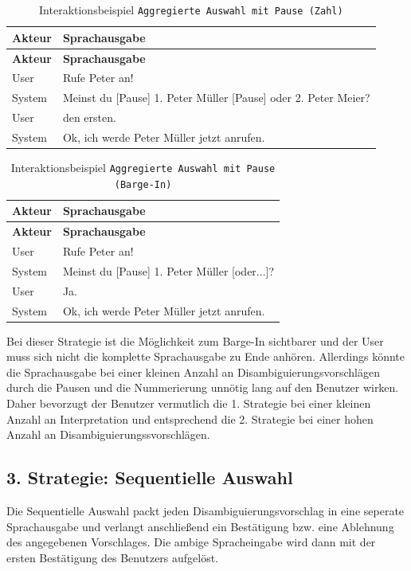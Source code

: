 \documentclass[12pt,a4paper]{scrartcl}
\begin{document}
\begin{longtable}{p{6cm}p{8cm}}
	\caption[Interaktionsbeispiel \texttt{Aggregierte Auswahl mit Pause (Zahl)}]{Interaktionsbeispiel \texttt{Aggregierte Auswahl mit Pause (Zahl)}}\\
	\hline
	\textbf{Akteur} &	\textbf{Sprachausgabe}\\
	\hline
	\endfirsthead
	\hline
	\textbf{Akteur} &	\textbf{Sprachausgabe}\\
	\hline
	\endhead
User & Rufe Peter an!\\
System & Meinst du [Pause] 1. Peter Müller [Pause] oder 2. Peter Meier?\\
User & den ersten.\\
System & Ok, ich werde Peter Müller jetzt anrufen.\\

\hline
\end{longtable}

\begin{longtable}{p{6cm}p{8cm}}
	\caption[Interaktionsbeispiel \texttt{Aggregierte Auswahl mit Pause (Barge-In)}]{Interaktionsbeispiel \texttt{Aggregierte Auswahl mit Pause (Barge-In)}}\\
	\hline
	\textbf{Akteur} &	\textbf{Sprachausgabe}\\
	\hline
	\endfirsthead
	\hline
	\textbf{Akteur} &	\textbf{Sprachausgabe}\\
	\hline
	\endhead
User & Rufe Peter an!\\
System & Meinst du [Pause] 1. Peter Müller [oder...]?\\
User & Ja.\\
System & Ok, ich werde Peter Müller jetzt anrufen.\\

\hline
\end{longtable}

Bei dieser Strategie ist die Möglichkeit zum Barge-In sichtbarer und der User muss sich nicht die komplette Sprachausgabe zu Ende anhören. Allerdings könnte die Sprachausgabe bei einer kleinen Anzahl an Disambiguierungsvorschlägen durch die Pausen und die Nummerierung unnötig lang auf den Benutzer wirken. Daher bevorzugt der Benutzer vermutlich die 1. Strategie bei einer kleinen Anzahl an Interpretation und entsprechend die 2. Strategie bei einer hohen Anzahl an Disambiguierungssvorschlägen.

\subsection{3. Strategie: Sequentielle Auswahl}
Die Sequentielle Auswahl packt jeden Disambiguierungsvorschlag in eine seperate Sprachausgabe und verlangt anschließend ein Bestätigung bzw. eine Ablehnung des angegebenen Vorschlages. Die ambige Spracheingabe wird dann mit der ersten Bestätigung des Benutzers aufgelöst.
\end{document}
